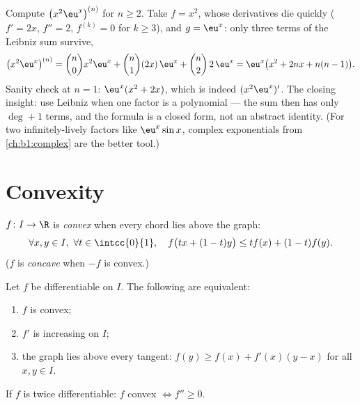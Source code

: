\begin{example}\label{ex:b1:derivative:leibnizaction}
Compute $\bigl(x^2 \eu^x\bigr)^{(n)}$ for $n \geq 2$. Take $f =
x^2$, whose derivatives die quickly ($f' = 2x$, $f'' = 2$,
$f^{(k)} = 0$ for $k \geq 3$), and $g = \eu^x$: only three terms
of the Leibniz sum survive,
\[
\bigl(x^2\eu^x\bigr)^{(n)}
= \binom n0 x^2 \eu^x + \binom n1 (2x)\,\eu^x + \binom n2\,
2\,\eu^x
= \eu^x\bigl(x^2 + 2nx + n(n-1)\bigr).
\]
Sanity check at $n = 1$: $\eu^x(x^2 + 2x)$, which is indeed
$(x^2\eu^x)'$. The closing insight: use Leibniz when one factor
is a polynomial --- the sum then has only $\deg + 1$ terms, and
the formula is a closed form, not an abstract identity. (For two
infinitely-lively factors like $\eu^x\sin x$, complex
exponentials from \cref{ch:b1:complex} are the better tool.)
\end{example}

\section{Convexity}

\begin{definition}\label{def:b1:derivative:convex}
$f \colon I \to \R$ is \emph{convex} when
every chord lies above the graph:
\[
\forall x, y \in I,\ \forall t \in \intcc{0}{1}, \quad
f\bigl(tx + (1-t)y\bigr) \leq t f(x) + (1-t) f(y).
\]
($f$ is \emph{concave} when $-f$ is convex.)
\end{definition}

\begin{theorem}\label{thm:b1:derivative:convexchar}
Let $f$ be differentiable on $I$. The following are equivalent:
\begin{enumerate}
  \item $f$ is convex;
  \item $f'$ is increasing on $I$;
  \item the graph lies above every tangent: $f(y) \geq f(x) +
        f'(x)(y - x)$ for all $x, y \in I$.
\end{enumerate}
If $f$ is twice differentiable: $f$ convex $\iff f'' \geq 0$.
\end{theorem}

